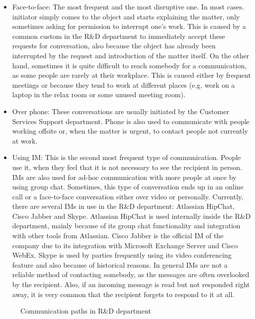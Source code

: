 \documentclass[11pt,singleside]{myfithesis2}
\newcommand{\pict}[4]{
	\begin{figure}[h!]
  		\vspace{-7px}
  		\centerline{\fcolorbox{darkgray}{palegray}{\texttt{[image: \#2]}}}
  		\caption{#1}
  		\label{#4}
	\end{figure}
}
\begin{document}
\begin{itemize}
	\item{Face-to-face:} The most frequent and the most disruptive one. In most cases. initiator simply comes to the object and starts explaining the matter, only sometimes asking for permission to interrupt one's work. This is caused by a common custom in the R\&D department to immediately accept these requests for conversation, also because the object has already been interrupted by the request and introduction of the matter itself. On the other hand, sometimes it is quite difficult to reach somebody for a communication, as some people are rarely at their workplace. This is caused either by frequent meetings or because they tend to work at different places (e.g. work on a laptop in the relax room or some unused meeting room).
	\item{Over phone:} These conversations are usually initiated by the Customer Services Support department. Phone is also used to communicate with people working offsite or, when the matter is urgent, to contact people not currently at work.
	\item{Using IM:} This is the second most frequent type of communication. People use it, when they feel that it is not necessary to see the recipient in person. IMs are also used for ad-hoc communication with more people at once by using group chat. Sometimes, this type of conversation ends up in an online call or a face-to-face conversation either over video or personally.  Currently, there are several IMs in use in the R\&D department: Atlassian HipChat, Cisco Jabber and Skype. Atlassian HipChat is used internally inside the R\&D department, mainly because of its group chat functionality and integration with other tools from Atlassian. Cisco Jabber is the official IM of the company due to its integration with Microsoft Exchange Server and Cisco WebEx. Skype is used by parties frequently using its video conferencing feature and also because of historical reasons. In general IMs are not a reliable method of contacting somebody, as the messages are often overlooked by the recipient. Also, if an incoming message is read but not responded right away, it is very common that the recipient forgets to respond to it at all.
\end{itemize}

\pict{Communication paths in R\&D department}{data/paths.png}{width=1\textwidth}{pic:paths}
\end{document}

